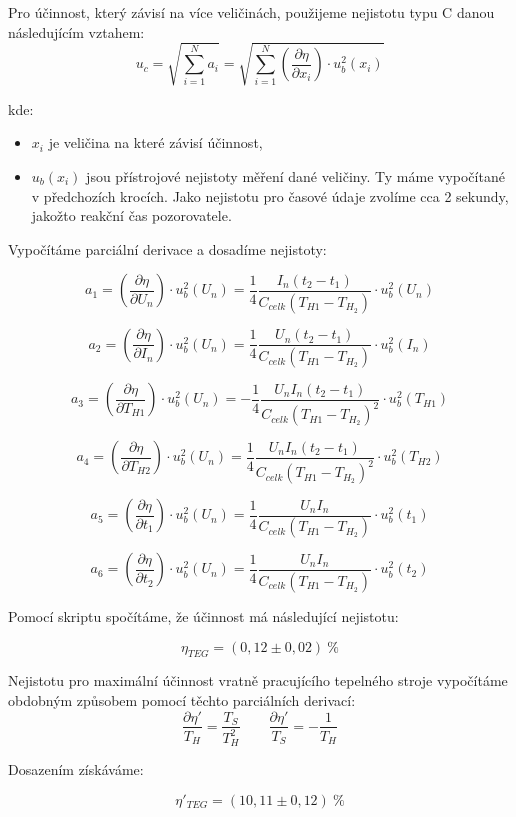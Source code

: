 \documentclass[a4paper,12pt]{article}
\begin{document}
Pro účinnost, který závisí na více veličinách, použijeme nejistotu typu C danou následujícím vztahem:
$$u_c = \sqrt{\sum_{i=1}^{N}{a_i}} = \sqrt{\sum_{i=1}^{N}{\left(\frac{\partial \eta}{\partial x_i}\right)\cdot u_b^2(x_i)}}$$

kde:
\begin{itemize}
    \item $x_i$ je veličina na které závisí účinnost,
    \item $u_b(x_i)$ jsou přístrojové nejistoty měření dané veličiny. Ty máme vypočítané v předchozích krocích. Jako nejistotu pro časové údaje zvolíme cca 2 sekundy, jakožto reakční čas pozorovatele.
\end{itemize}

Vypočítáme parciální derivace a dosadíme nejistoty:

$$a_1 = \left( \frac{\partial \eta}{\partial U_n} \right) \cdot u_b^2(U_n) = \frac{1}{4} \frac{I_n(t_2-t_1)}{C_{celk} (T_{H1} - T_{H_2})} \cdot u_b^2(U_n)$$

$$a_2 = \left( \frac{\partial \eta}{\partial I_n} \right) \cdot u_b^2(U_n) = \frac{1}{4} \frac{U_n(t_2-t_1)}{C_{celk} (T_{H1} - T_{H_2})} \cdot u_b^2(I_n)$$

$$a_3 = \left( \frac{\partial \eta}{\partial T_{H1}} \right) \cdot u_b^2(U_n) = -\frac{1}{4} \frac{U_n I_n(t_2-t_1)}{C_{celk} (T_{H1} - T_{H_2})^2} \cdot u_b^2(T_{H1})$$

$$a_4 = \left( \frac{\partial \eta}{\partial T_{H2}} \right) \cdot u_b^2(U_n) = \frac{1}{4} \frac{U_n I_n(t_2-t_1)}{C_{celk} (T_{H1} - T_{H_2})^2} \cdot u_b^2(T_{H2})$$

$$a_5 = \left( \frac{\partial \eta}{\partial t_1} \right) \cdot u_b^2(U_n) = \frac{1}{4} \frac{U_n I_n}{C_{celk} (T_{H1} - T_{H_2})} \cdot u_b^2(t_1) $$

$$a_6 = \left( \frac{\partial \eta}{\partial t_2} \right) \cdot u_b^2(U_n) = \frac{1}{4} \frac{U_n I_n}{C_{celk} (T_{H1} - T_{H_2})} \cdot u_b^2(t_2)$$

Pomocí skriptu spočítáme, že účinnost má následující nejistotu:

$$\eta_{TEG} = (0,12 \pm 0,02)\ \unit{\%}$$

Nejistotu pro maximální účinnost vratně pracujícího tepelného stroje vypočítáme obdobným způsobem pomocí těchto parciálních derivací:
$$\frac{\partial \eta'}{T_H} = \frac{T_S}{T_H^2}
\quad \quad
\frac{\partial \eta'}{T_S} = -\frac{1}{T_H}$$

Dosazením získáváme:

$$\eta'_{TEG} = (10,11 \pm 0,12)\ \unit{\%}$$
\end{document}
